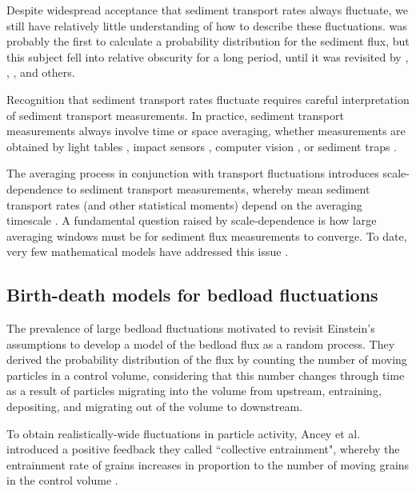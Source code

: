 Despite widespread acceptance that sediment transport rates always fluctuate, we still have relatively little understanding of how to describe these fluctuations.
\citet{Hamamori1962} was probably the first to calculate a probability distribution for the sediment flux, but this subject fell into relative obscurity for a long period, until it was revisited by \citet{Nikora1997}, \citet{Sun2000}, \citet{Ancey2006}, and others.

Recognition that sediment transport rates fluctuate requires careful interpretation of sediment transport measurements. 
In practice, sediment transport measurements always involve time or space averaging, whether measurements are obtained by light tables \citep{Zimmermann2008, Chartrand2018}, impact sensors \citep{Rickenmann2007, Mendes2016}, computer vision \citep{Roseberry2012, Ancey2014}, or sediment traps \citep{Bunte2004, Papangelakis2016}.

The averaging process in conjunction with transport fluctuations introduces scale-dependence to sediment transport measurements, whereby mean sediment transport rates (and other statistical moments) depend on the averaging timescale \citep{Turowski2010,Campagnol2012,Ancey2020a}.
A fundamental question raised by scale-dependence is how large averaging windows must be for sediment flux measurements to converge.
To date, very few mathematical models have addressed this issue \citep[e.g.][]{Ancey2020a}.

\subsection{Birth-death models for bedload fluctuations}
\label{sec:birthdeath}
The prevalence of large bedload fluctuations motivated \citet{Ancey2006,Ancey2008} to revisit Einstein's assumptions to develop a model of the bedload flux as a random process.
They derived the probability distribution of the flux by counting the number of moving particles in a control volume, considering that this number changes through time as a result of particles migrating into the volume from upstream, entraining, depositing, and migrating out of the volume to downstream.

To obtain realistically-wide fluctuations in particle activity, Ancey et al. introduced a positive feedback they called ``collective entrainment", whereby the entrainment rate of grains increases in proportion to the number of moving grains in the control volume \citep{Ancey2008,Heyman2013}.

